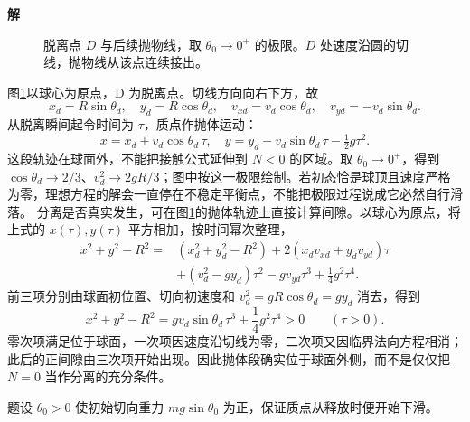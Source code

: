 \documentclass[11pt,openany,fontset=fandol]{ctexbook}
\theoremstyle{definition}\newtheorem{example}{例}[chapter]\newtheorem{exercise}{习题}[chapter]
\newcommand{\SolutionStart}{\par\medskip\ifdim\pagetotal>0pt\ifdim\dimexpr\pagegoal-\pagetotal\relax<3\baselineskip\newpage\fi\fi\noindent\textbf{解}\quad\ignorespaces}
\newenvironment{solution}{\SolutionStart}{\par\medskip}
\begin{document}
\begin{solution}
\begin{figure}[H]
\caption{脱离点 $D$ 与后续抛物线，取 $\theta_0\to0^+$ 的极限。$D$ 处速度沿圆的切线，抛物线从该点连续接出。}\label{mp5:fig:l5-h9-s}
\end{figure}

图\ref{mp5:fig:l5-h9-s}以球心为原点，D 为脱离点。切线方向向右下方，故
\[
x_d=R\sin\theta_d,\quad y_d=R\cos\theta_d,\quad
v_{xd}=v_d\cos\theta_d,\quad v_{yd}=-v_d\sin\theta_d.
\]
从脱离瞬间起令时间为 $\tau$，质点作抛体运动：
\[
\boxed{x=x_d+v_d\cos\theta_d\,\tau,\quad
y=y_d-v_d\sin\theta_d\,\tau-\tfrac12g\tau^2.}
\]
这段轨迹在球面外，不能把接触公式延伸到 $N<0$ 的区域。取 $\theta_0\to0^+$，得到 $\cos\theta_d\to2/3$、$v_d^2\to2gR/3$；图中按这一极限绘制。若初态恰是球顶且速度严格为零，理想方程的解会一直停在不稳定平衡点，不能把极限过程说成它必然自行滑落。
分离是否真实发生，可在图\ref{mp5:fig:l5-h9-s}的抛体轨迹上直接计算间隙。以球心为原点，将上式的 $x(\tau),y(\tau)$ 平方相加，按时间幂次整理，
\[
\begin{aligned}
x^2+y^2-R^2={}&(x_d^2+y_d^2-R^2)
+2(x_dv_{xd}+y_dv_{yd})\tau\\
&+(v_d^2-gy_d)\tau^2-gv_{yd}\tau^3+\frac14g^2\tau^4.
\end{aligned}
\]
前三项分别由球面初位置、切向初速度和 $v_d^2=gR\cos\theta_d=gy_d$ 消去，得到
\[
x^2+y^2-R^2
=g v_d\sin\theta_d\,\tau^3+\frac14g^2\tau^4>0
\qquad(\tau>0).
\]
零次项满足位于球面，一次项因速度沿切线为零，二次项又因临界法向方程相消；此后的正间隙由三次项开始出现。因此抛体段确实位于球面外侧，而不是仅仅把 $N=0$ 当作分离的充分条件。

题设 $\theta_0>0$ 使初始切向重力 $mg\sin\theta_0$ 为正，保证质点从释放时便开始下滑。

\end{solution}
\end{document}
